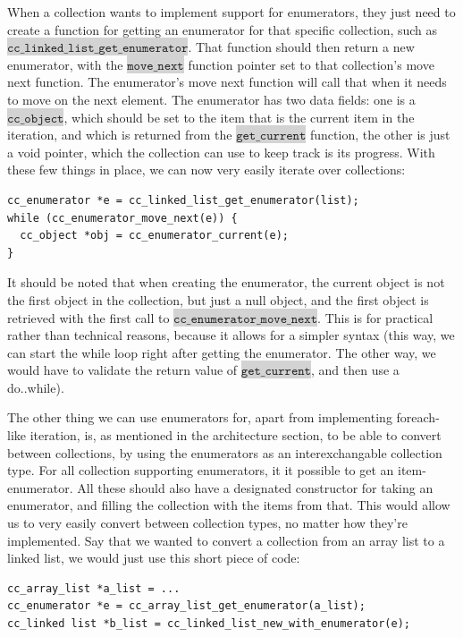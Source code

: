 \documentclass[table]{ituthesis}
\newcommand{\highlight}[1]{\colorbox{lightGray}{$\displaystyle \texttt{#1}$}}
\begin{document}
	When a collection wants to implement support for enumerators, they just need to create a function for getting an enumerator for that specific collection, such as \highlight{cc\_linked\_list\_get\_enumerator}. That function should then return a new enumerator, with the \highlight{move\_next} function pointer set to that collection's move next function. The enumerator's move next function will call that when it needs to move on the next element. The enumerator has two data fields: one is a \highlight{cc\_object}, which should be set to the item that is the current item in the iteration, and which is returned from the \highlight{get\_current} function, the other is just a void pointer, which the collection can use to keep track is its progress. With these few things in place, we can now very easily iterate over collections:

\begin{lstlisting}[label=cc_enumerator-example,caption=Using enumerators in CCollections]
cc_enumerator *e = cc_linked_list_get_enumerator(list);
while (cc_enumerator_move_next(e)) {
  cc_object *obj = cc_enumerator_current(e);
}
\end{lstlisting}

	It should be noted that when creating the enumerator, the current object is not the first object in the collection, but just a null object, and the first object is retrieved with the first call to \highlight{cc\_enumerator\_move\_next}. This is for practical rather than technical reasons, because it allows for a simpler syntax (this way, we can start the while loop right after getting the enumerator. The other way, we would have to validate the return value of \highlight{get\_current}, and then use a do..while).

	The other thing we can use enumerators for, apart from implementing foreach-like iteration, is, as mentioned in the architecture section, to be able to convert between collections, by using the enumerators as an interexchangable collection type. For all collection supporting enumerators, it it possible to get an item-enumerator. All these should also have a designated constructor for taking an enumerator, and filling the collection with the items from that. This would allow us to very easily convert between collection types, no matter how they're implemented. Say that we wanted to convert a collection from an array list to a linked list, we would just use this short piece of code:

\begin{lstlisting}[label=cc_enumerator-new-with,caption=Creating collections with enumerators]
cc_array_list *a_list = ...
cc_enumerator *e = cc_array_list_get_enumerator(a_list);
cc_linked list *b_list = cc_linked_list_new_with_enumerator(e);
\end{lstlisting}
\end{document}
